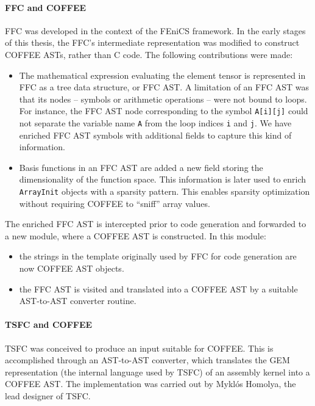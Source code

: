 \paragraph{FFC and COFFEE}
FFC was developed in the context of the FEniCS framework. In the early stages of this thesis, the FFC's intermediate representation was modified to construct COFFEE ASTs, rather than C code. The following contributions were made:
\begin{itemize}
\item The mathematical expression evaluating the element tensor is represented in FFC as a tree data structure, or FFC AST. A limitation of an FFC AST was that its nodes -- symbols or arithmetic operations -- were not bound to loops. For instance, the FFC AST node corresponding to the symbol \texttt{A[i][j]} could not separate the variable name \texttt{A} from the loop indices \texttt{i} and \texttt{j}. We have enriched FFC AST symbols with additional fields to capture this kind of information.
\item Basis functions in an FFC AST are added a new field storing the dimensionality of the function space. This information is later used to enrich \texttt{ArrayInit} objects with a sparsity pattern. This enables sparsity optimization without requiring COFFEE to ``sniff'' array values.
\end{itemize}

The enriched FFC AST is intercepted prior to code generation and forwarded to a new module, where a COFFEE AST is constructed. In this module:
\begin{itemize}
\item the strings in the template originally used by FFC for code generation are now COFFEE AST objects.
\item the FFC AST is visited and translated into a COFFEE AST by a suitable AST-to-AST converter routine.
\end{itemize}

\paragraph{TSFC and COFFEE}
TSFC was conceived to produce an input suitable for COFFEE. This is accomplished through an AST-to-AST converter, which translates the GEM representation (the internal language used by TSFC) of an assembly kernel into a COFFEE AST. The implementation was carried out by Myklós Homolya, the lead designer of TSFC.


